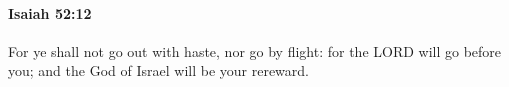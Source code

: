 
		\paragraph{Isaiah 52:12} %
			\label{ISAIAH-52-12}

			For ye shall not go out with haste, nor go by flight: for the LORD will go before you; and the God of Israel will be your rereward.


